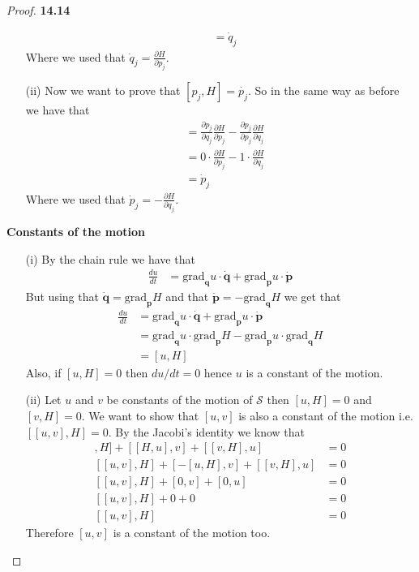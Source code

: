 \documentclass[11pt]{article}
\newcommand{\ngrad}[1]{\text{grad}_{\bm{#1}}}
\theoremstyle{definition}
\begin{document}
\begin{proof}{\textbf{14.14}}
\begin{itemize}
\begin{align*}
            &= \dot{q}_j
        \end{align*}
        Where we used that $\dot{q}_j = \frac{\partial H}{\partial p_j}$.
        \item[(ii)] Now we want to prove that $[p_j, H] = \dot{p_j}$. So in the
        same way as before we have that 
        \begin{align*}
            [p_j, H] &= 
                \frac{\partial p_j}{\partial q_j}\frac{\partial H}{\partial p_j} -
                \frac{\partial p_j}{\partial p_j}\frac{\partial H}{\partial q_j}\\
            &= 0\cdot \frac{\partial H}{\partial p_j} - 1\cdot \frac{\partial H}{\partial q_j}\\
            &= \dot{p}_j
        \end{align*}
        Where we used that $\dot{p}_j = -\frac{\partial H}{\partial q_j}$.
    \end{itemize}
    \cleardoublepage
    \textbf{Constants of the motion}
    \begin{itemize}
        \item[(i)] By the chain rule we have that
        \begin{align*}
            \frac{du}{dt}
                &= \ngrad{q}u \cdot \dot{\bm{q}} + \ngrad{p}u \cdot \dot{\bm{p}}
        \end{align*}
        But using that $\dot{\bm{q}} = \ngrad{p}H$ and that
        $\dot{\bm{p}} = -\ngrad{q}H$ we get that
        \begin{align*}
            \frac{du}{dt}    
                &= \ngrad{q}u \cdot \dot{\bm{q}} + \ngrad{p}u \cdot \dot{\bm{p}}\\
                &= \ngrad{q}u \cdot \ngrad{p}H - \ngrad{p}u \cdot \ngrad{q}H\\
                &= [u, H]
        \end{align*}
        Also, if $[u, H] = 0$ then $du/dt = 0$ hence $u$ is a constant of
        the motion.
        
        \item[(ii)] Let $u$ and $v$ be constants of the motion of $\mathcal{S}$
        then $[u, H] = 0$ and $[v, H] = 0$. We want to show that $[u,v]$ is
        also a constant of the motion i.e. $[[u,v], H] = 0$. By
        the Jacobi's identity we know that
        \begin{align*}
            [[u,v], H] + [[H,u], v] + [[v, H], u] &= 0\\
            [[u,v], H] + [-[u, H], v] + [[v, H], u] &= 0\\
            [[u,v], H] + [0, v] + [0, u] &= 0\\
            [[u,v], H] + 0 + 0 &= 0\\
            [[u,v], H] &= 0
        \end{align*}
        Therefore $[u,v]$ is a constant of the motion too.
        

\end{itemize}
\end{proof}
\end{document}
